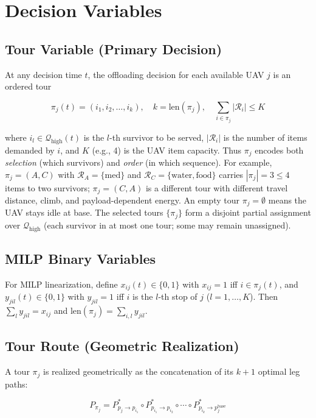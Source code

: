 \documentclass[conference]{IEEEtran}
\begin{document}
\section{Decision Variables}

\subsection{Tour Variable (Primary Decision)}
At any decision time $t$, the offloading decision for each available UAV $j$ is an ordered tour

\begin{equation}
\pi_j(t) = (i_1, i_2, \dots, i_k), \quad k = \text{len}(\pi_j), \quad \sum_{i\in\pi_j} |\mathcal{R}_i| \leq K
\end{equation}

where $i_l \in \mathcal{Q}_{\text{high}}(t)$ is the $l$-th survivor to be served, $|\mathcal{R}_i|$ is the number of items demanded by $i$, and $K$ (e.g., 4) is the UAV item capacity. Thus $\pi_j$ encodes both \textit{selection} (which survivors) and \textit{order} (in which sequence). For example, $\pi_j=(A,C)$ with $\mathcal{R}_A=\{\text{med}\}$ and $\mathcal{R}_C=\{\text{water},\text{food}\}$ carries $|\pi_j|=3\leq4$ items to two survivors; $\pi_j=(C,A)$ is a different tour with different travel distance, climb, and payload-dependent energy. An empty tour $\pi_j=\emptyset$ means the UAV stays idle at base. The selected tours $\{\pi_j\}$ form a disjoint partial assignment over $\mathcal{Q}_{\text{high}}$ (each survivor in at most one tour; some may remain unassigned).

\subsection{MILP Binary Variables}
For MILP linearization, define $x_{ij}(t)\in\{0,1\}$ with $x_{ij}=1$ iff $i\in\pi_j(t)$, and $y_{jil}(t)\in\{0,1\}$ with $y_{jil}=1$ iff $i$ is the $l$-th stop of $j$ ($l=1,\dots,K$). Then $\sum_{l}y_{jil}=x_{ij}$ and $\text{len}(\pi_j)=\sum_{i,l}y_{jil}$.

\subsection{Tour Route (Geometric Realization)}
A tour $\pi_j$ is realized geometrically as the concatenation of its $k+1$ optimal leg paths:

\begin{equation}
P_{\pi_j} = P_{p_j \to p_{i_1}}^* \circ P_{p_{i_1} \to p_{i_2}}^* \circ \cdots \circ P_{p_{i_k} \to p_j^{\text{base}}}^*
\label{eq:tour}
\end{equation}
\end{document}
